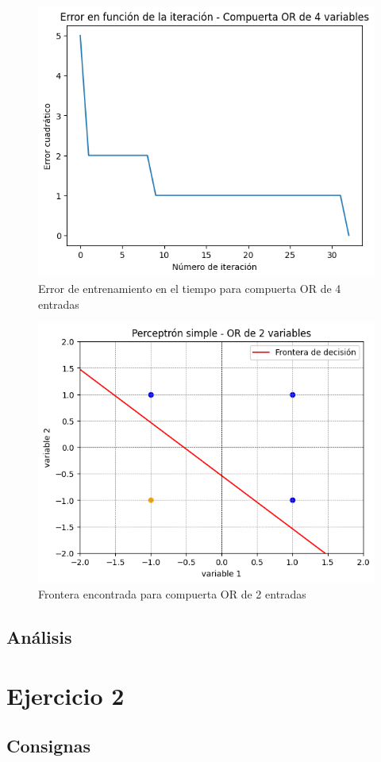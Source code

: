 \documentclass[11pt]{article} %
\begin{document}
\begin{figure}[h!]
	\centering
	\includegraphics[width=0.7\linewidth]{../imgs/ej1/OR4}
	\caption[]{Error de entrenamiento en el tiempo para compuerta OR de 4 entradas}
	\label{fig:or4}
\end{figure}

\begin{figure}[h!]
	\centering
	\includegraphics[width=0.7\linewidth]{../imgs/ej1/ORFRONT}
	\caption[]{Frontera encontrada para compuerta OR de 2 entradas}
	\label{fig:orfront}
\end{figure}


\subsection{Análisis}

\section{Ejercicio 2}

\subsection{Consignas}
\end{document}
